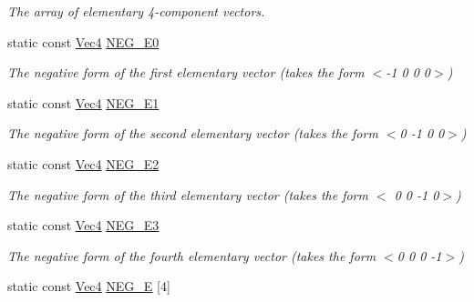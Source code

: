 \begin{DoxyCompactItemize}
\begin{DoxyCompactList}\small\item\em The array of elementary 4-\/component vectors. \end{DoxyCompactList}\item 
\hypertarget{classgfxmath_1_1_vec4_a53b82498b3cd56013b5d6c3844887762}{}static const \hyperlink{classgfxmath_1_1_vec4}{Vec4} \hyperlink{classgfxmath_1_1_vec4_a53b82498b3cd56013b5d6c3844887762}{N\+E\+G\+\_\+\+E0}\label{classgfxmath_1_1_vec4_a53b82498b3cd56013b5d6c3844887762}

\begin{DoxyCompactList}\small\item\em The negative form of the first elementary vector (takes the form $<$-\/1 0 0 0$>$) \end{DoxyCompactList}\item 
\hypertarget{classgfxmath_1_1_vec4_a031568f305d117ba88e7304bea12e505}{}static const \hyperlink{classgfxmath_1_1_vec4}{Vec4} \hyperlink{classgfxmath_1_1_vec4_a031568f305d117ba88e7304bea12e505}{N\+E\+G\+\_\+\+E1}\label{classgfxmath_1_1_vec4_a031568f305d117ba88e7304bea12e505}

\begin{DoxyCompactList}\small\item\em The negative form of the second elementary vector (takes the form $<$0 -\/1 0 0$>$) \end{DoxyCompactList}\item 
\hypertarget{classgfxmath_1_1_vec4_a0bb4824329e79246c0489fb2e8f47a0d}{}static const \hyperlink{classgfxmath_1_1_vec4}{Vec4} \hyperlink{classgfxmath_1_1_vec4_a0bb4824329e79246c0489fb2e8f47a0d}{N\+E\+G\+\_\+\+E2}\label{classgfxmath_1_1_vec4_a0bb4824329e79246c0489fb2e8f47a0d}

\begin{DoxyCompactList}\small\item\em The negative form of the third elementary vector (takes the form $<$ 0 0 -\/1 0$>$) \end{DoxyCompactList}\item 
\hypertarget{classgfxmath_1_1_vec4_a32b83e6413346bc53270f26742196700}{}static const \hyperlink{classgfxmath_1_1_vec4}{Vec4} \hyperlink{classgfxmath_1_1_vec4_a32b83e6413346bc53270f26742196700}{N\+E\+G\+\_\+\+E3}\label{classgfxmath_1_1_vec4_a32b83e6413346bc53270f26742196700}

\begin{DoxyCompactList}\small\item\em The negative form of the fourth elementary vector (takes the form $<$0 0 0 -\/1$>$) \end{DoxyCompactList}\item 
\hypertarget{classgfxmath_1_1_vec4_ae7d194fe94f7bf6aacb24a0e9f9571c2}{}static const \hyperlink{classgfxmath_1_1_vec4}{Vec4} \hyperlink{classgfxmath_1_1_vec4_ae7d194fe94f7bf6aacb24a0e9f9571c2}{N\+E\+G\+\_\+\+E} \mbox{[}4\mbox{]}\label{classgfxmath_1_1_vec4_ae7d194fe94f7bf6aacb24a0e9f9571c2}


\end{DoxyCompactItemize}
